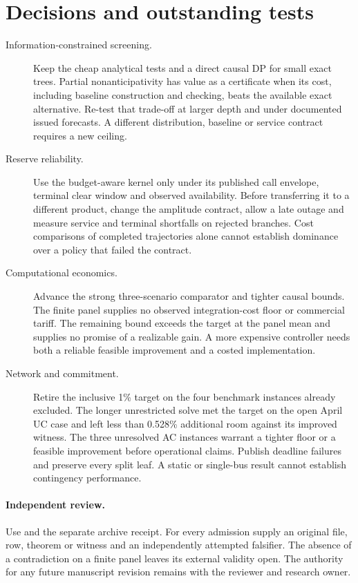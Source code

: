 \documentclass[11pt,letterpaper]{article}
\begin{document}
\section{Decisions and outstanding tests}
\begin{description}
\item[Information-constrained screening.] Keep the cheap analytical tests and a direct causal DP for small exact trees. Partial nonanticipativity has value as a certificate when its cost, including baseline construction and checking, beats the available exact alternative. Re-test that trade-off at larger depth and under documented issued forecasts. A different distribution, baseline or service contract requires a new ceiling.
\item[Reserve reliability.] Use the budget-aware kernel only under its published call envelope, terminal clear window and observed availability. Before transferring it to a different product, change the amplitude contract, allow a late outage and measure service and terminal shortfalls on rejected branches. Cost comparisons of completed trajectories alone cannot establish dominance over a policy that failed the contract.
\item[Computational economics.] Advance the strong three-scenario comparator and tighter causal bounds. The finite panel supplies no observed integration-cost floor or commercial tariff. The remaining bound exceeds the target at the panel mean and supplies no promise of a realizable gain. A more expensive controller needs both a reliable feasible improvement and a costed implementation.
\item[Network and commitment.] Retire the inclusive 1\% target on the four benchmark instances already excluded. The longer unrestricted solve met the target on the open April UC case and left less than 0.528\% additional room against its improved witness. The three unresolved AC instances warrant a tighter floor or a feasible improvement before operational claims. Publish deadline failures and preserve every split leaf. A static or single-bus result cannot establish contingency performance.
\end{description}

\paragraph{Independent review.}
Use  and the separate archive receipt. For every admission supply an original file, row, theorem or witness and an independently attempted falsifier. The absence of a contradiction on a finite panel leaves its external validity open. The authority for any future manuscript revision remains with the reviewer and research owner.
\end{document}
